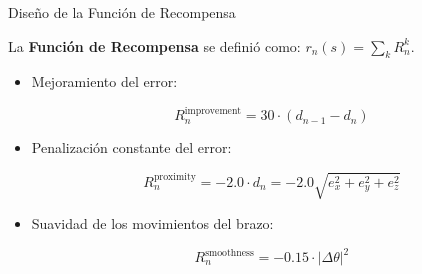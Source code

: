\documentclass[spanish,10pt]{beamer}
\begin{document}
	\begin{frame}{Diseño de la Función de Recompensa}
		\begin{exampleblock}{}
			La \textbf{Función de Recompensa} se definió como: $r_n(s) = \sum_{k} R_n^{k}$.
			
			\begin{itemize}
				\item Mejoramiento del error:
				
				\begin{equation}
					R_{n}^{\text{improvement}} = 30 \cdot (d_{n-1} - d_{n})
				\end{equation}
				
				\item Penalización constante del error:
				
				\begin{equation}
					R_{n}^{\text{proximity}} = -2.0 \cdot d_n = -2.0 \sqrt{e_x^2 + e_y^2 + e_z^2}
				\end{equation}
				
				\item Suavidad de los movimientos del brazo:
				
				\begin{equation}
					R_{n}^{\text{smoothness}} = -0.15 \cdot \left|\Delta\theta\right|^2
				\end{equation}
				
			\end{itemize}
			
		\end{exampleblock}
	\end{frame}
	
\end{document}

